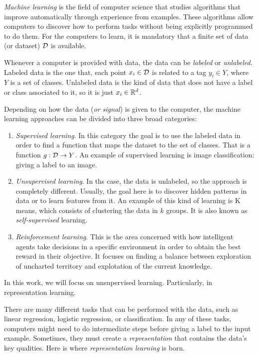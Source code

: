 \label{Chapter:Intro:Rep:Learning}

\emph{Machine learning} is the field of computer science that studies algorithms that improve automatically through experience from examples. 
These algorithms allow computers to discover how to
perform tasks without being explicitly programmed to do them. For the computers to learn, it is mandatory that a finite set of data (or dataset) $\mathcal{D}$ is available. 

Whenever a computer is provided with data, the data can be \emph{labeled} or \emph{unlabeled}. Labeled data is the one that, each point $x_i \in \mathcal{D}$ is related to a tag $y_i \in Y$, where $Y$ is a set of classes.
Unlabeled data is the kind of data that does not have a label or class associated to it, so it is just $x_i \in \mathbb{R}^d$. 

Depending on how the data (\emph{or signal}) is given to the computer, the machine learning approaches can be divided into three broad categories:
\begin{enumerate}
    \item \emph{Supervised learning}. In this category the goal is to use the labeled data in order to find a function that maps the dataset to the set of classes. That is a function $g:\mathcal{D} \to Y$. 
    An example of supervised learning is image classification: giving a label to an image.
    \item \emph{Unsupervised learning}. In ths case, the data is unlabeled, so the approach is completely different. Usually, the goal here is to discover hidden patterns in data or to learn features from it.
    An example of this kind of learning is K means, which consists of clustering the data in $k$ groups. It is also known as \emph{self-supervised} learning.
    \item \emph{Reinforcement learning}. This is the area concerned with how intelligent agents take decisions in a specific environment in order to obtain the best reward in their objective. It focuses on finding a balance between exploration of uncharted territory and explotation of the current knowledge.

\end{enumerate}

In this work, we will focus on unsupervised learning. Particularly, in representation learning.

There are many different tasks that can be performed with the data, such as linear regression, logistic regression, or classification. In any of these tasks, computers might need
to do intermediate steps before giving a label to the input example. Sometimes, they must create a \emph{representation} that 
contains the data's key qualities.  Here is where \emph{representation learning} is born. 


